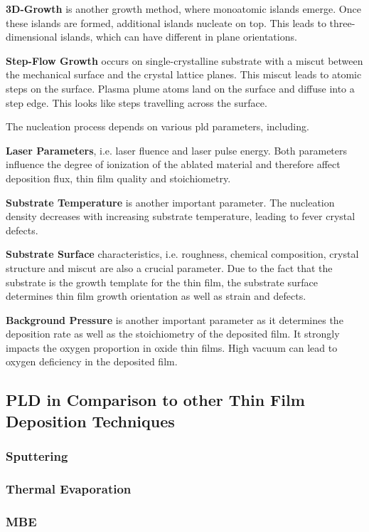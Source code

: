 \textbf{3D-Growth} is another growth method, where monoatomic islands 
emerge. 
Once these islands are formed, additional islands nucleate on top.
This leads to three-dimensional islands, which can have different in plane orientations.  

\textbf{Step-Flow Growth} occurs on single-crystalline substrate with a miscut between
the mechanical surface and the crystal lattice planes.
This miscut leads to atomic steps on the surface.
Plasma plume atoms land on the surface and diffuse into a step edge.
This looks like steps travelling across the surface.

The nucleation process depends on various \ac{pld} parameters, including.

\textbf{Laser Parameters}, i.e. laser fluence and laser pulse energy.
Both parameters influence the degree of ionization of the ablated material and therefore
affect deposition flux, thin film quality and stoichiometry. 

\textbf{Substrate Temperature} is another important parameter. 
The nucleation density decreases with increasing substrate temperature, leading to 
fever crystal defects.

\textbf{Substrate Surface} characteristics, i.e. roughness, chemical composition, 
crystal structure and miscut are also a crucial parameter.
Due to the fact that the substrate is the growth template for the thin film, 
the substrate surface determines thin film growth orientation as well as strain and 
defects.

\textbf{Background Pressure} is another important parameter as it determines
the deposition rate as well as the stoichiometry of the deposited film.
It strongly impacts the oxygen proportion in oxide thin films.
High vacuum can lead to oxygen deficiency in the deposited film.

\subsection{PLD in Comparison to other Thin Film Deposition Techniques}
\subsubsection{Sputtering}
\subsubsection{Thermal Evaporation}
\subsubsection{MBE}

